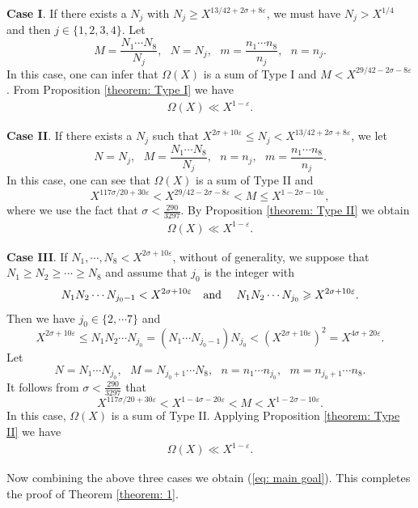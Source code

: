 \documentclass[12pt, reqno, twoside, letterpaper]{amsart}
\numberwithin{equation}{section}
\theoremstyle{customthm}
\theoremstyle{customrem}
\begin{document}
\textbf{Case I}.  If there exists a $N_j$ with $N_j\geqslant X^{13/42+2\sigma+8\varepsilon}$,
we must have $N_j>X^{1/4}$ and then $j\in\{1,2,3,4\}$. Let
$$
M=\frac{N_1\cdots N_8}{N_j},\ \ \ N=N_j,\ \ \
m=\frac{n_1\cdots n_8}{n_j},\ \ \ n=n_j.
$$
In this case, one can infer that $\Omega(X)$ is a sum of Type I and $M<X^{29/42-2\sigma-8\varepsilon}$.
From Proposition \ref{theorem: Type I} we have
\begin{align*}
\Omega(X)\ll X^{1-\varepsilon}.
\end{align*}

\textbf{Case II}. If there exists a $N_j$ such that
$X^{2\sigma+10\varepsilon}\leqslant N_j<X^{13/42+2\sigma+8\varepsilon}$, we let
$$
N=N_j,\ \ \ M=\frac{N_1\cdots N_8}{N_j},\ \ \ n=n_j,\ \ \ m=\frac{n_1\cdots n_8}{n_j}.
$$
In this case, one can see that $\Omega(X)$ is a sum of Type II and
$$
X^{117\sigma/20+30\varepsilon}<
X^{29/42-2\sigma-8\varepsilon}<M\leqslant X^{1-2\sigma-10\varepsilon},
$$
where we use the fact that $\sigma< \frac{290}{3297}$. By Proposition \ref{theorem: Type II}
we obtain
\begin{align*}
\Omega(X)\ll X^{1-\varepsilon}.
\end{align*}

\textbf{Case III}. If $N_1,\cdots,N_8<X^{2\sigma+10\varepsilon}$, without of generality,
we suppose that $N_1\geqslant N_2\geqslant \cdots\geqslant N_8$ and assume that
$j_0$ is the integer with
$$
N_1N_2\cdots N_{j_0-1}<X^{2\sigma+10\varepsilon}\ \ \ \hbox{and }\ \ \
N_1N_2\cdots N_{j_0}\geqslant X^{2\sigma+10\varepsilon}.
$$
Then we have $j_0\in\{2,\cdots 7\}$ and
$$
X^{2\sigma+10\varepsilon}\leqslant N_1N_2\cdots N_{j_0}=(N_1\cdots N_{j_0-1})N_{j_0}
<\left(X^{2\sigma+10\varepsilon}\right)^2=X^{4\sigma+20\varepsilon}.
$$
Let
$$
N=N_1\cdots N_{j_0},\ \ \ M=N_{j_0+1}\cdots N_8,\ \ \
n=n_1\cdots n_{j_0},\ \ \ m=n_{j_0+1}\cdots n_8.
$$
It follows from $\sigma<\frac{290}{3297}$ that
$$
X^{117\sigma/20+30\varepsilon}<X^{1-4\sigma-20\varepsilon}< M<X^{1-2\sigma-10\varepsilon}.
$$
In this case, $\Omega(X)$ is a sum of Type II. Applying Proposition \ref{theorem: Type II} we have
\begin{align*}
\Omega(X)\ll X^{1-\varepsilon}.
\end{align*}

Now combining the above three cases we obtain (\ref{eq: main goal}).
This completes the proof of Theorem \ref{theorem: 1}.

\end{document}
